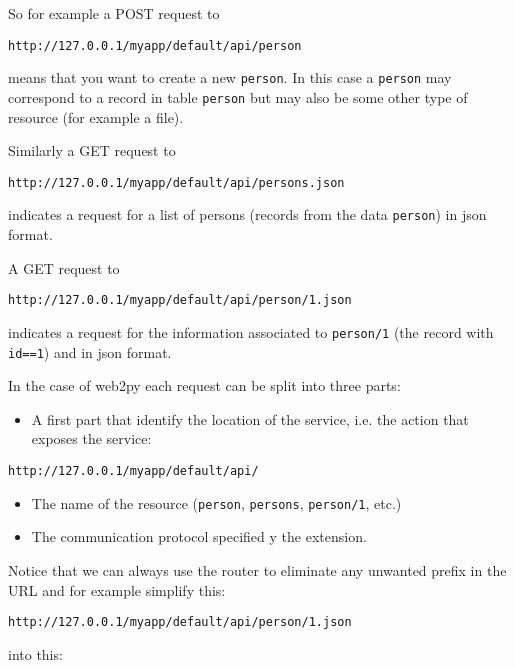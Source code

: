 \documentclass[justified,sixbynine,notoc]{tufte-book}
\def\ft{\small\tt}
\begin{document}
\begin{fullwidth}
So for example a POST request to

\begin{lstlisting}[keywords={}]
http://127.0.0.1/myapp/default/api/person
\end{lstlisting}
\noindent means that you want to create a new {\ft person}. In this case a {\ft person} may correspond to a record in table {\ft person} but may also be some other type of resource (for example a file).

Similarly a GET request to

\begin{lstlisting}[keywords={}]
http://127.0.0.1/myapp/default/api/persons.json
\end{lstlisting}
\noindent indicates a request for a list of persons (records from the data {\ft person}) in json format.

A GET request to

\begin{lstlisting}[keywords={}]
http://127.0.0.1/myapp/default/api/person/1.json
\end{lstlisting}
\noindent indicates a request for the information associated to {\ft person/1} (the record with {\ft id==1}) and in json format.

In the case of web2py each request can be split into three parts:

\begin{itemize}
\item A first part that identify the location of the service, i.e. the action that exposes the service:
\end{itemize}
\begin{lstlisting}[keywords={}]
http://127.0.0.1/myapp/default/api/
\end{lstlisting}
\begin{itemize}
\item The name of the resource ({\ft person}, {\ft persons}, {\ft person/1}, etc.)

\item The communication protocol specified y the extension.
\end{itemize}

Notice that we can always use the router to eliminate any unwanted prefix in the URL and for example simplify this:

\begin{lstlisting}[keywords={}]
http://127.0.0.1/myapp/default/api/person/1.json
\end{lstlisting}
\noindent into this:


\end{fullwidth}
\end{document}
